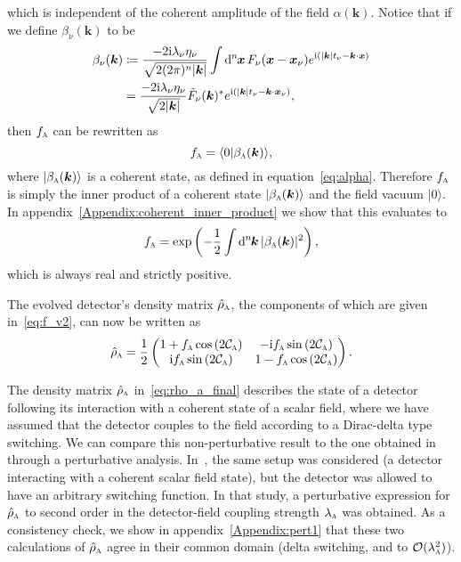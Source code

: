 \documentclass[pra,nofootinbib,floats,aps,twocolumn,tightenlines,superscriptaddress]{revtex4-1}
\renewcommand*\d[2][]{%
	\mathrm{d}%
	\ifx\relax#1\relax\else
	\rule{-0.02em}{1.5ex}^{#1}\rule{0.08em}{0ex}\!
	\fi
	#2\,
}
\newcommand{\ket}[1]{| {#1} \rangle}
\newcommand{\ii}{\mathrm{i}}
\newcommand{\rhoa}{\hat{\rho}_\textsc{a}}
\newcommand{\ca}{\mathcal{C}_\textsc{a}}
\newcommand{\fa}{f_\textsc{a}}
\newcommand{\ba}{\beta_\textsc{a}(\bm k)}
\newcommand{\bnu}{\beta_\nu(\bm k)}
\begin{document}
which is independent of the coherent amplitude of the field $\alpha(\bm k)$. Notice that if we define $\bnu$ to be
\begin{align}
\label{eq:bnu}
    \bnu
    &\coloneqq
    \frac{-2\ii\lambda_\nu\eta_\nu}{\sqrt{2(2\pi)^n|\bm{k}|}}
    \int \d[n]{\bm{x}}
    F_\nu(\bm{x}-\bm{x}_\nu)
    e^{\ii(|\bm{k}|t_\nu-\bm{k}\cdot\bm{x})}
    \notag\\
    &=
    \frac{-2\ii\lambda_\nu\eta_\nu}{\sqrt{2|\bm{k}|}}
    \tilde{F}_\nu(\bm{k})^*
    e^{\ii(|\bm{k}|t_\nu-\bm{k}\cdot\bm{x}_\nu)},
\end{align}
then $\fa$ can be rewritten as
\begin{equation}
    \fa
    =
    \langle 0 \ket{\ba},
\end{equation}
where $\ket{\ba}$ is a coherent state, as defined in equation~\eqref{eq:alpha}. Therefore $\fa$ is simply the inner product of a coherent state $\ket{\ba}$ and the field vacuum $\ket{0}$. In appendix~\ref{Appendix:coherent_inner_product} we show that this evaluates to
\begin{equation}
\label{eq:fa_final}
    f_\textsc{a}
    =
    \exp\left(
    -\frac{1}{2}
    \int\d[n]{\bm k}
    |\ba|^2
    \right),
\end{equation}
which is always real and strictly positive.

The evolved detector's density matrix $\rhoa$, the components of which are given in~\eqref{eq:f_v2}, can now be written as
\begin{equation}
\label{eq:rho_a_final}
	\rhoa
	=
	\frac{1}{2}
	\begin{pmatrix}
	1
	+\fa\cos
	\left(2\ca\right) &
	-\ii\fa\sin
	\left(2\ca\right) \\
	\ii\fa\sin
	\left(2\ca\right) &
	1
	-\fa\cos
	\left(2\ca\right)
	\end{pmatrix}.
\end{equation}

The density matrix $\rhoa$ in~\eqref{eq:rho_a_final} describes the state of a detector following its interaction with a coherent state of a scalar field, where we have assumed that the detector couples to the field according to a Dirac-delta type switching. We can compare this non-perturbative result to the one obtained in~\cite{Simidzija2017b} through a perturbative analysis. In~\cite{Simidzija2017b}, the same setup was considered (a detector interacting with a coherent scalar field state), but the detector was allowed to have an arbitrary switching function. In that study, a perturbative expression for $\rhoa$ to second order in the detector-field coupling strength $\lambda_\textsc{a}$ was obtained. As a consistency check, we show in appendix~\ref{Appendix:pert1} that these two calculations of $\rhoa$ agree in their common domain (delta switching, and to $\mathcal{O}(\lambda_\textsc{a}^2)$).
\end{document}
